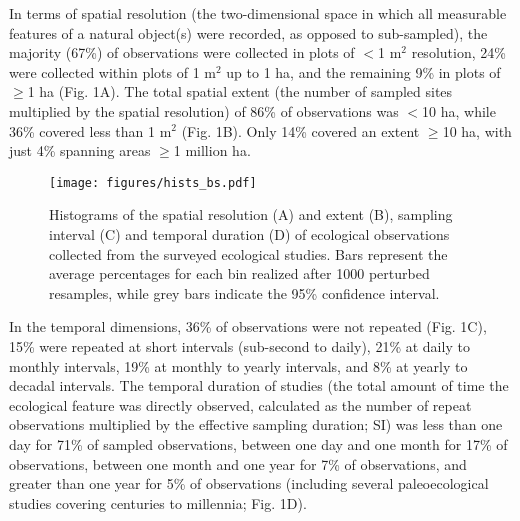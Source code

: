 \documentclass[12pt]{article}
\begin{document}
In terms of spatial resolution (the two-dimensional space in which all measurable features of a natural object(s) were recorded, as opposed to sub-sampled), the majority (67\%) of observations were collected in plots of $<$1 m$^2$ resolution, 24\% were collected within plots of 1 m$^2$ up to 1 ha, and the remaining 9\% in plots of $\geq$1 ha (Fig. 1A). The total spatial extent (the number of sampled sites multiplied by the spatial resolution) of 86\% of observations was $<$10 ha, while 36\% covered less than 1 m$^2$ (Fig. 1B). Only 14\% covered an extent $\geq$10 ha, with just 4\% spanning areas $\geq$1 million ha. 


\begin{figure}[!ht]
\texttt{[image: figures/hists\_bs.pdf]}
\vspace{-0.15 cm}
\caption{Histograms of the spatial resolution (A) and extent (B), sampling interval (C) and temporal duration (D) of ecological observations collected from the surveyed ecological studies. Bars represent the average percentages for each bin realized after 1000 perturbed resamples, while grey bars indicate the 95\% confidence interval. }
\label{afoto1}
\end{figure}

In the temporal dimensions, 36\% of observations were not repeated (Fig. 1C), 15\% were repeated at short intervals (sub-second to daily), 21\% at daily to monthly intervals, 19\% at monthly to yearly intervals, and 8\% at yearly to decadal intervals. The temporal duration of studies (the total amount of time the ecological feature was directly observed, calculated as the number of repeat observations multiplied by the effective sampling duration; SI) was less than one day for 71\% of sampled observations, between one day and one month for 17\% of observations, between one month and one year for 7\% of observations, and greater than one year for 5\% of observations (including several paleoecological studies covering centuries to millennia; Fig. 1D).
\end{document}
